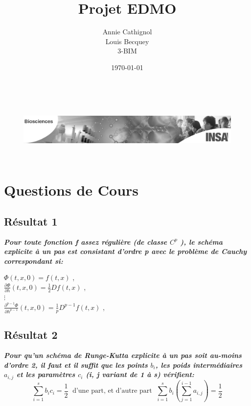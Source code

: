 \documentclass[a4paper,12pt,landscape]{article}
\begin{document}
\title{Projet EDMO}
\author{Annie Cathignol\\Louis Becquey\\3-BIM}
\date{\today}
\maketitle
\begin{center}
\begin{figure}[b!]
\includegraphics[height=3.2cm]{InsaBioLogo3.png}
\end{figure}
\end{center}
\newpage

\section{Questions de Cours}
\subsection{Résultat 1}
{\it \bf Pour toute fonction f assez régulière (de classe $C^{p}$ ), le schéma explicite à un pas est consistant d’ordre p avec le problème de Cauchy correspondant si:}\\
\begin{center}
$\Phi (t,x,0) = f(t,x)$ ,  \\
$\frac{\partial \Phi}{\partial h} (t,x,0) = \frac{1}{2}Df(t,x)$ , \\
$\vdots$ \\
$\frac{\partial^{p-1}\Phi}{\partial h^{p-1}} (t,x,0) = \frac{1}{p}D^{p-1}f(t,x)$ , \\
\end{center}


\subsection{Résultat 2}
{\it \bf Pour qu’un schéma de Runge-Kutta explicite à un pas soit au-moins d’ordre 2, il faut et il suffit que les points $b_{i}$, les poids intermédiaires $a_{i,j}$ et les paramètres $c_{i}$ (i, j variant de 1 à s) vérifient:} $$\sum_{i=1}^{s}b_{i}c_{i} = \frac{1}{2} \; \textrm{   d'une part, et d'autre part   } \; \sum_{i=1}^{s}b_{i}(\sum_{j=1}^{i-1}a_{i,j})= \frac{1}{2}$$
\end{document}
